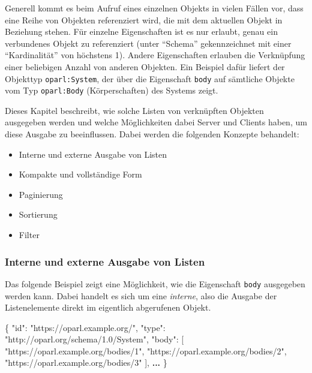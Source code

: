 \documentclass[,a4paper]{article}
\newenvironment{Shaded}{}{}
\newcommand{\DataTypeTok}[1]{\textcolor[rgb]{0.56,0.13,0.00}{{#1}}}
\newcommand{\StringTok}[1]{\textcolor[rgb]{0.25,0.44,0.63}{{#1}}}
\newcommand{\OtherTok}[1]{\textcolor[rgb]{0.00,0.44,0.13}{{#1}}}
\newcommand{\FunctionTok}[1]{\textcolor[rgb]{0.02,0.16,0.49}{{#1}}}
\newcommand{\ErrorTok}[1]{\textcolor[rgb]{1.00,0.00,0.00}{\textbf{{#1}}}}
\begin{document}

Generell kommt es beim Aufruf eines einzelnen Objekts in vielen Fällen
vor, dass eine Reihe von Objekten referenziert wird, die mit dem
aktuellen Objekt in Beziehung stehen. Für einzelne Eigenschaften ist es
nur erlaubt, genau ein verbundenes Objekt zu referenziert (unter
``Schema'' gekennzeichnet mit einer ``Kardinalität'' von höchstens 1).
Andere Eigenschaften erlauben die Verknüpfung einer beliebigen Anzahl
von anderen Objekten. Ein Beispiel dafür liefert der Objekttyp
\texttt{oparl:System}, der über die Eigenschaft \texttt{body} auf
sämtliche Objekte vom Typ \texttt{oparl:Body} (Körperschaften) des
Systems zeigt.

Dieses Kapitel beschreibt, wie solche Listen von verknüpften Objekten
ausgegeben werden und welche Möglichkeiten dabei Server und Clients
haben, um diese Ausgabe zu beeinflussen. Dabei werden die folgenden
Konzepte behandelt:

\begin{itemize}
\itemsep1pt\parskip0pt
\item
  Interne und externe Ausgabe von Listen
\item
  Kompakte und vollständige Form
\item
  Paginierung
\item
  Sortierung
\item
  Filter
\end{itemize}

\subsubsection{Interne und externe Ausgabe von
Listen}\label{objektlistenux5finternextern}

Das folgende Beispiel zeigt eine Möglichkeit, wie die Eigenschaft
\texttt{body} ausgegeben werden kann. Dabei handelt es sich um eine
\emph{interne}, also die Ausgabe der Listenelemente direkt im eigentlich
abgerufenen Objekt.

\begin{Shaded}
\begin{Highlighting}[]
\FunctionTok{\{}
    \DataTypeTok{"id"}\FunctionTok{:} \StringTok{"https://oparl.example.org/"}\FunctionTok{,}
    \DataTypeTok{"type"}\FunctionTok{:} \StringTok{"http://oparl.org/schema/1.0/System"}\FunctionTok{,}
    \DataTypeTok{"body"}\FunctionTok{:} \OtherTok{[}
        \StringTok{"https://oparl.example.org/bodies/1"}\OtherTok{,}
        \StringTok{"https://oparl.example.org/bodies/2"}\OtherTok{,}
        \StringTok{"https://oparl.example.org/bodies/3"}
    \OtherTok{]}\FunctionTok{,}
    \ErrorTok{...}
\FunctionTok{\}}
\end{Highlighting}
\end{Shaded}
\end{document}

